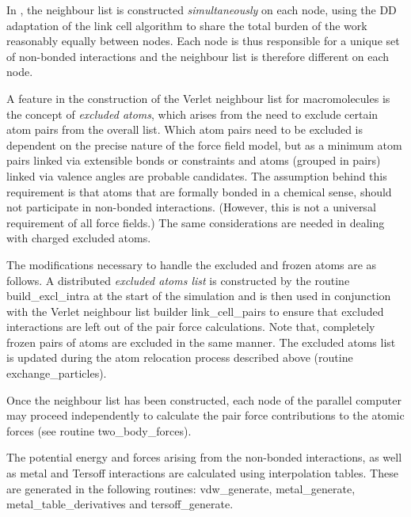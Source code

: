 In \D, the neighbour list is
constructed {\em simultaneously} on each node, using the DD
adaptation of the link cell algorithm to share the total burden of
the work reasonably equally between nodes.  Each node is thus
responsible for a unique set of non-bonded interactions and the
neighbour list is therefore different on each node.

A feature in the construction of the Verlet
neighbour list for macromolecules is the concept of
{\em excluded atoms}, which arises from the need to exclude
certain atom pairs from the overall list.  Which atom pairs need
to be excluded is dependent on the precise nature of the force
field model, but as a minimum atom pairs linked
via extensible bonds or
constraints and atoms (grouped in pairs)
linked via valence angles are
probable candidates.  The assumption behind this requirement is
that atoms that are formally bonded in a
chemical sense, should not participate in
non-bonded interactions.  (However,
this is not a universal requirement of all force fields.)
The same considerations are needed in
dealing with charged excluded atoms.

The modifications necessary to handle the excluded and frozen atoms
are as follows.  A distributed {\em excluded atoms list} is
constructed by the \D routine {\sc build\_excl\_intra} at the start
of the simulation and is then used in conjunction with the Verlet
neighbour list builder {\sc link\_cell\_pairs} to ensure that
excluded interactions are left out of the pair force calculations.
Note that, completely frozen pairs of atoms are excluded in the same
manner.  The excluded atoms list is updated during the atom relocation
process described above (\D routine {\sc exchange\_particles}).

Once the neighbour list has been constructed, each node of the
parallel computer may proceed independently to calculate the pair
force contributions to the atomic forces (see routine {\sc
two\_body\_forces}).

The potential energy and forces arising from the
non-bonded interactions, as well as
metal and Tersoff
interactions are calculated using interpolation tables.  These
are generated in the following routines: {\sc vdw\_generate},
{\sc metal\_generate}, {\sc metal\_table\_derivatives} and
{\sc tersoff\_generate}.

